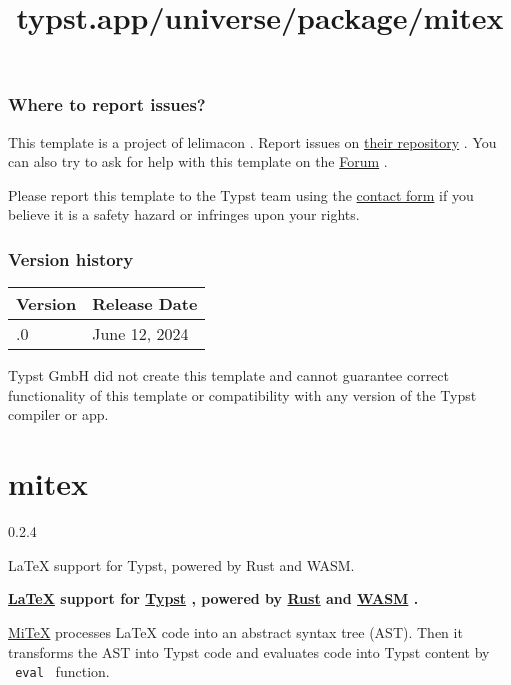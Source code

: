\subsubsection{Where to report issues?}\label{where-to-report-issues}

This template is a project of lelimacon . Report issues on
\href{https://github.com/lelimacon/typst-minimal-cv}{their repository} .
You can also try to ask for help with this template on the
\href{https://forum.typst.app}{Forum} .

Please report this template to the Typst team using the
\href{https://typst.app/contact}{contact form} if you believe it is a
safety hazard or infringes upon your rights.

\label{versions}
\subsubsection{Version history}\label{version-history}

\begin{longtable}[]{@{}ll@{}}
\toprule\noalign{}
Version & Release Date \\
\midrule\noalign{}
\endhead
\bottomrule\noalign{}
\endlastfoot
0.1.0 & June 12, 2024 \\
\end{longtable}

Typst GmbH did not create this template and cannot guarantee correct
functionality of this template or compatibility with any version of the
Typst compiler or app.


\title{typst.app/universe/package/mitex}

\label{banner}
\section{mitex}\label{mitex}

{ 0.2.4 }

LaTeX support for Typst, powered by Rust and WASM.

\label{readme}
\textbf{\href{https://www.latex-project.org/}{LaTeX} support for
\href{https://typst.app/}{Typst} , powered by
\href{https://www.rust-lang.org/}{Rust} and
\href{https://webassembly.org/}{WASM} .}

\href{https://github.com/mitex-rs/mitex}{MiTeX} processes LaTeX code
into an abstract syntax tree (AST). Then it transforms the AST into
Typst code and evaluates code into Typst content by \texttt{\ eval\ }
function.

